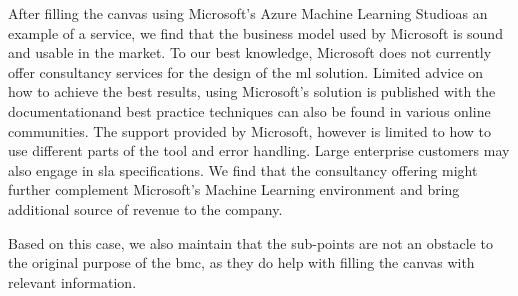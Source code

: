 After filling the canvas using Microsoft's Azure Machine Learning Studio\footnotemark as an example of a service, we find that the business model used by Microsoft is sound and usable in the market. To our best knowledge, Microsoft does not currently offer consultancy services for the design of the \acrshort{ml} solution.
% 
% 
Limited advice on how to achieve the best results, using Microsoft's solution is published with the documentation\footnotemark and best practice techniques can also be found in various online communities. The support provided by Microsoft, however is limited to how to use different parts of the tool and error handling. Large enterprise customers may also engage in \acrshort{sla} specifications. We find that the consultancy offering might further complement Microsoft's Machine Learning environment and bring additional source of revenue to the company.
% 

Based on this case, we also maintain that the sub-points are not an obstacle to the original purpose of the \acrshort{bmc}, as they do help with filling the canvas with relevant information. 